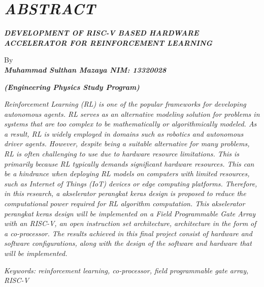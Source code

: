 \clearpage
\chapter*{\textit{ABSTRACT}}

\vspace{5mm}

\begin{center}
	\center
	\large\bfseries\MakeUppercase{\textit{DEVELOPMENT OF RISC-V BASED HARDWARE ACCELERATOR FOR REINFORCEMENT LEARNING}}
	
	\normalfont\normalsize
	
	By\\
	\bfseries{\textit{Muhammad Sulthan Mazaya \hspace{5mm} NIM: 13320028}}
	
	\vspace{5mm}
	\large\bfseries{\textit{(Engineering Physics Study Program)}}
	\vspace{5mm}
\end{center}


\begin{singlespace}
	\small
	\textit{Reinforcement Learning (RL) is one of the popular frameworks for developing
		autonomous agents. RL serves as an alternative modeling solution for problems in
		systems that are too complex to be mathematically or algorithmically modeled. As
		a result, RL is widely employed in domains such as robotics and autonomous driver
		agents. However, despite being a suitable alternative for many problems, RL is
		often challenging to use due to hardware resource limitations. This is primarily
		because RL typically demands significant hardware resources. This can be a
		hindrance when deploying RL models on computers with limited resources, such as
		Internet of Things (IoT) devices or edge computing platforms. Therefore, in this
		research, a akselerator perangkat keras design is proposed to reduce the
		computational power required for RL algorithm computation. This akselerator
		perangkat keras design will be implemented on a Field Programmable Gate Array
		with an RISC-V, an open instruction set architecture, architecture in the form of a
		co-processor. The results achieved in this final project consist of hardware and
		software configurations, along with the design of the software and hardware that
		will be implemented.
	}
	
	\textit{Keywords: reinforcement learning, co-processor, field programmable gate array, RISC-V}
\end{singlespace}
\clearpage

\clearpage
